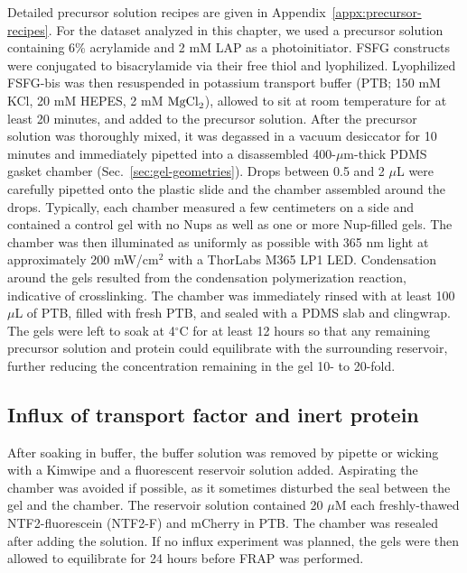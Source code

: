 Detailed precursor solution recipes are given in Appendix~\ref{appx:precursor-recipes}.  For the dataset analyzed in this chapter, we used a precursor solution containing 6\% acrylamide and 2 mM LAP as a photoinitiator.  FSFG constructs were conjugated to bisacrylamide via their free thiol and lyophilized.   Lyophilized FSFG-bis was then resuspended in potassium transport buffer (PTB; 150 mM KCl, 20 mM HEPES, 2 mM $\mathrm{MgCl}_2$), allowed to sit at room temperature for at least 20 minutes, and added to the precursor solution.  After the precursor solution was thoroughly mixed, it was degassed in a vacuum desiccator for 10 minutes and immediately pipetted into a disassembled 400-$\mu$m-thick PDMS gasket chamber (Sec.~\ref{sec:gel-geometries}).  Drops between 0.5 and 2 $\mu$L were carefully pipetted onto the plastic slide and the chamber assembled around the drops.  Typically, each chamber measured a few centimeters on a side and contained a control gel with no Nups as well as one or more Nup-filled gels.  The chamber was then illuminated as uniformly as possible with 365 nm light at approximately 200 mW/cm$^2$ with a ThorLabs M365 LP1 LED.  Condensation around the gels resulted from the condensation polymerization reaction, indicative of crosslinking.  The chamber was immediately rinsed with at least 100 $\mu$L of PTB, filled with fresh PTB, and sealed with a PDMS slab and clingwrap.  The gels were left to soak at 4$^\circ$C for at least 12 hours so that any remaining precursor solution and protein could equilibrate with the surrounding reservoir, further reducing the concentration remaining in the gel 10- to 20-fold.

\subsection{Influx of transport factor and inert protein}
After soaking in buffer, the buffer solution was removed by pipette or wicking with a Kimwipe and a fluorescent reservoir solution added.  Aspirating the chamber was avoided if possible, as it sometimes disturbed the seal between the gel and the chamber.  The reservoir solution contained 20 $\mu$M each freshly-thawed NTF2-fluorescein (NTF2-F) and mCherry in PTB.  The chamber was resealed after adding the solution.  If no influx experiment was planned, the gels were then allowed to  equilibrate for 24 hours before FRAP was performed.

